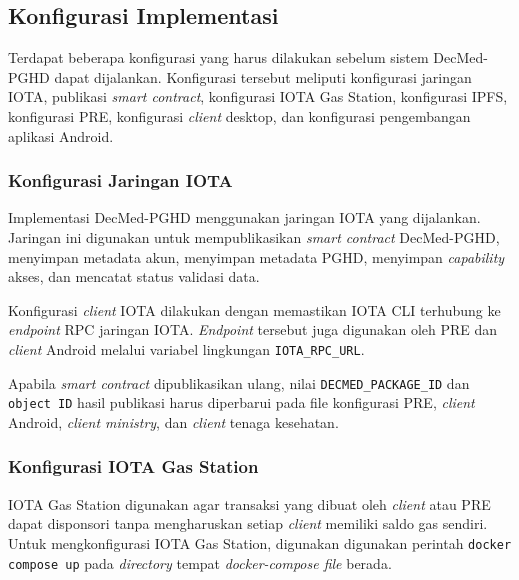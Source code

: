 \subsection{Konfigurasi Implementasi}

Terdapat beberapa konfigurasi yang harus dilakukan sebelum sistem DecMed-PGHD dapat dijalankan.
Konfigurasi tersebut meliputi konfigurasi jaringan IOTA, publikasi \textit{smart contract}, konfigurasi IOTA Gas Station, konfigurasi IPFS, konfigurasi PRE, konfigurasi \textit{client} desktop, dan konfigurasi pengembangan aplikasi Android.

\subsubsection{Konfigurasi Jaringan IOTA}

Implementasi DecMed-PGHD menggunakan jaringan IOTA yang dijalankan.
Jaringan ini digunakan untuk mempublikasikan \textit{smart contract} DecMed-PGHD, menyimpan metadata akun, menyimpan metadata PGHD, menyimpan \textit{capability} akses, dan mencatat status validasi data.

Konfigurasi \textit{client} IOTA dilakukan dengan memastikan IOTA CLI terhubung ke \textit{endpoint} RPC jaringan IOTA\@.
\textit{Endpoint} tersebut juga digunakan oleh PRE dan \textit{client} Android melalui variabel lingkungan \texttt{IOTA\_RPC\_URL}.


Apabila \textit{smart contract} dipublikasikan ulang, nilai \texttt{DECMED\_PACKAGE\_ID} dan \texttt{object ID} hasil publikasi harus diperbarui pada file konfigurasi PRE, \textit{client} Android, \textit{client ministry}, dan \textit{client} tenaga kesehatan.

\subsubsection{Konfigurasi IOTA Gas Station}

IOTA Gas Station digunakan agar transaksi yang dibuat oleh \textit{client} atau PRE dapat disponsori tanpa mengharuskan setiap \textit{client} memiliki saldo gas sendiri. 
Untuk mengkonfigurasi IOTA Gas Station, digunakan digunakan perintah \texttt{docker compose up} pada \textit{directory} tempat \textit{docker-compose file} berada.


